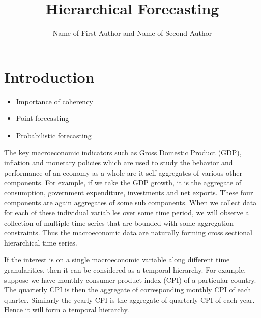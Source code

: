 \documentclass[graybox]{svmult}
\begin{document}
\title*{Hierarchical Forecasting}
\author{Name of First Author and Name of Second Author}
%
%
\maketitle



\section{Introduction}\label{sec:intro}


\begin{itemize}
	\item Importance of coherency
	\item Point forecasting
	\item Probabilistic forecasting
\end{itemize}
			

The key macroeconomic indicators such as Gross Domestic Product (GDP), inflation and monetary policies which are used to study the behavior and performance of an economy as a whole are it self aggregates of various other components.
For example, if we take the GDP growth, it is the aggregate of consumption, government expenditure, investments and net exports. These four components are again aggregates of some sub components. When we collect data for each of these individual variab
les over some time period, we will observe a collection of multiple time series that are bounded with some aggregation constraints. Thus the macroeconomic data are naturally forming cross sectional hierarchical time series.

If the interest is on a single macroeconomic variable along different time granularities, then it can be considered as a temporal hierarchy. For example, suppose we have monthly consumer product index (CPI) of a particular country. The quarterly CPI is then the aggregate of corresponding monthly CPI of each quarter. Similarly the yearly CPI is the aggregate of quarterly CPI of each year. Hence it will form a temporal hierarchy.
\end{document}
